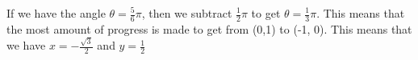 \documentclass[preview]{standalone}
\begin{document}
\begin{center}
If we have the angle $\theta = \frac{5}{6} \pi$, then we subtract $\frac{1}{2} \pi$ to get $\theta = \frac{1}{3} \pi$. This means that the most amount of progress is made to get from (0,1) to (-1, 0). This means that we have $x= - \frac{\sqrt{3}}{2}$ and $y=\frac{1}{2}$
\end{center}
\end{document}
